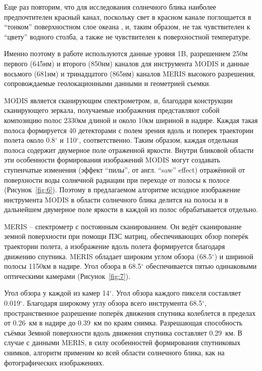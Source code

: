 Еще раз повторим, что для исследования солнечного блика наиболее предпочтителен красный канал, поскольку свет в красном канале поглощается в ``тонком'' поверхностном слое океана \citep{Jerlov1976}, и, таким образом, не так чувствителен к ``цвету'' водного столба, а также не чувствителен к поверхностной температуре.

Именно поэтому в работе используются данные уровня 1B, разрешением 250м первого (645нм) и второго (850нм) каналов для инструмента MODIS и данные восьмого (681нм) и тринадцатого (865нм) каналов MERIS высокого разрешения, сопровождаемые геолокационными данными и геометрией съемки.

MODIS является сканирующим спектрометром, и, благодаря конструкции сканирующего зеркала, получаемые изображения представляют собой композицию полос 2330км длиной и около 10км шириной в надире. Каждая такая полоса формируется 40 детекторами с полем зрения вдоль и поперек траектории полета около 0.8${}^\circ$ и 110${}^\circ$, соответственно. Таким образом, каждая отдельная полоса содержит двумерное поле отраженной яркости. Внутри бликовой области эти особенности формирования изображений MODIS могут создавать ступенчатые изменения (эффект ``пилы'', от англ. ``saw'' effect) отражённой от поверхности воды солнечной радиации при переходе от полосы к полосе (Рисунок~\ref{fig:6}). Поэтому в предлагаемом алгоритме исходное изображение инструмента MODIS в области солнечного блика делится на полосы и в дальнейшем двумерное поле яркости в каждой из полос обрабатывается отдельно.

MERIS -- спектрометр с постоянным сканированием. Он ведёт сканирование земной поверхности при помощи ПЗС матриц, обеспечивающих обзор поперёк траектории полета, а изображение вдоль полета формируется благодаря движению спутника. MERIS обладает широким углом обзора (68.5${}^\circ$) и шириной полосы 1150км в надире. Угол обзора в 68.5${}^\circ$ обеспечивается пятью одинаковыми оптическими камерами (Рисунок~\ref{fig:7}).

Угол обзора у каждой из камер 14${}^\circ$. Угол обзора каждого пикселя составляет 0.019${}^\circ$. Благодаря широкому углу обзора всего инструмента 68.5${}^\circ$, пространственное разрешение поперёк движения спутника колеблется в пределах от 0.26~км в надире до 0.39~км по краям снимка. Разрешающая способность съёмки Земной поверхности вдоль движения спутника составляет 0.29~км. В случае с данными MERIS, в силу особенностей формирования спутниковых снимков, алгоритм применим ко всей области солнечного блика, как на фотографических изображениях.



